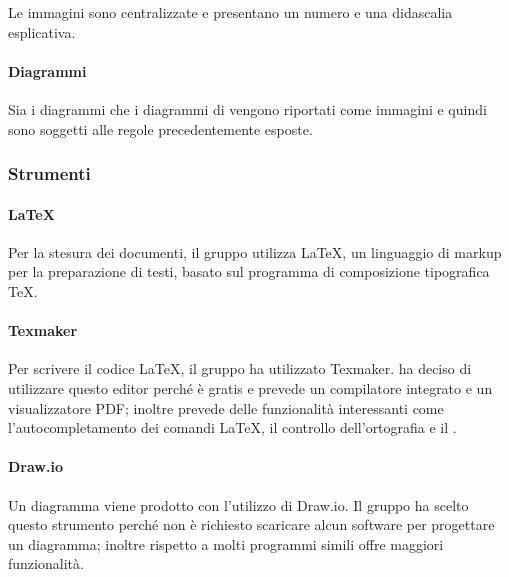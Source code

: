Le immagini sono centralizzate e presentano un numero e una didascalia esplicativa.

\paragraph{Diagrammi}

Sia i diagrammi  che i diagrammi di  vengono riportati come immagini e quindi sono soggetti alle regole precedentemente esposte.

\subsubsection{Strumenti}
\paragraph{\LaTeX{}}
Per la stesura dei documenti, il gruppo utilizza \LaTeX{}, un linguaggio di markup per la preparazione di testi, basato sul programma di composizione tipografica \TeX{}.

\paragraph{Texmaker}
Per scrivere il codice \LaTeX{}, il gruppo ha utilizzato Texmaker. \Gruppo{} ha deciso di utilizzare questo editor perché è gratis e prevede un compilatore integrato e un visualizzatore PDF; inoltre prevede delle funzionalità interessanti come l'autocompletamento dei comandi \LaTeX{}, il controllo dell'ortografia e il .

\paragraph{Draw.io}
Un diagramma  viene prodotto con l'utilizzo di Draw.io. Il gruppo ha scelto questo strumento perché non è richiesto scaricare alcun software per progettare un diagramma; inoltre rispetto a molti programmi simili offre maggiori funzionalità.









